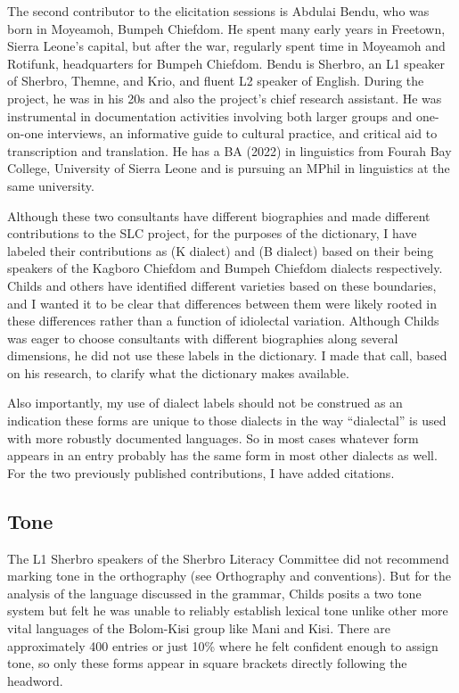 The second contributor to the elicitation sessions is Abdulai Bendu, who was born in Moyeamoh, Bumpeh Chiefdom. He spent many early years in Freetown, Sierra Leone’s capital, but after the war, regularly spent time in Moyeamoh and Rotifunk, headquarters for Bumpeh Chiefdom. Bendu is Sherbro, an L1 speaker of Sherbro, Themne, and Krio, and fluent L2 speaker of English. During the project, he was in his 20s and also the project’s chief research assistant. He was instrumental in documentation activities involving both larger groups and one-on-one interviews, an informative guide to cultural practice, and critical aid to transcription and translation. He has a BA (2022) in linguistics from Fourah Bay College, University of Sierra Leone and is pursuing an MPhil in linguistics at the same university. 

Although these two consultants have different biographies and made different contributions to the SLC project, for the purposes of the dictionary, I have labeled their contributions as (K dialect) and (B dialect) based on their being speakers of the Kagboro Chiefdom and Bumpeh Chiefdom dialects respectively. Childs and others have identified different varieties based on these boundaries, and I wanted it to be clear that differences between them were likely rooted in these differences rather than a function of idiolectal variation. Although Childs was eager to choose consultants with different biographies along several dimensions, he did not use these labels in the dictionary. I made that call, based on his research, to clarify what the dictionary makes available. 

Also importantly, my use of dialect labels should not be construed as an indication these forms are unique to those dialects in the way “dialectal” is used with more robustly documented languages. So in most cases whatever form appears in an entry probably has the same form in most other dialects as well. For the two previously published contributions, I have added citations. 

\subsection{Tone}
The L1 Sherbro speakers of the Sherbro Literacy Committee did not recommend marking tone in the orthography (see  Orthography and conventions). But for the analysis of the language discussed in the grammar, Childs posits a two tone system but felt he was unable to reliably establish lexical tone unlike other more vital languages of the Bolom-Kisi group like Mani and Kisi. There are approximately 400 entries or just 10\% where he felt confident enough to assign tone, so only these forms appear in square brackets directly following the headword. 

